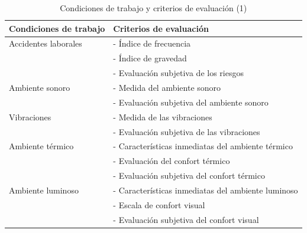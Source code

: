 \documentclass{article} %
\begin{document}
\newpage

\begin{table}[h!]
    \centering
    \begin{tabular}{|l|l|}
    \hline
    \textbf{Condiciones de trabajo}          & \textbf{Criterios de evaluación}                                  \\ \hline
    Accidentes laborales                     & - Índice de frecuencia                                            \\
                                             & - Índice de gravedad                                              \\
                                             & - Evaluación subjetiva de los riesgos                             \\ \hline
    Ambiente sonoro                          & - Medida del ambiente sonoro                                      \\
                                             & - Evaluación subjetiva del ambiente sonoro                        \\ \hline
    Vibraciones                              & - Medida de las vibraciones                                       \\
                                             & - Evaluación subjetiva de las vibraciones                         \\ \hline
    Ambiente térmico                         & - Características inmediatas del ambiente térmico                 \\
                                             & - Evaluación del confort térmico                                  \\
                                             & - Evaluación subjetiva del confort térmico                        \\ \hline
    Ambiente luminoso                        & - Características inmediatas del ambiente luminoso                \\
                                             & - Escala de confort visual                                        \\
                                             & - Evaluación subjetiva del confort visual                         \\ \hline
    \end{tabular}
    \caption{Condiciones de trabajo y criterios de evaluación (1)}
    \end{table}
    
\end{document}
